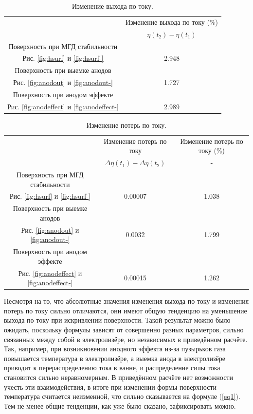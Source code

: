 \documentclass{article}
\begin{document}
\begin{table}[ht]
\centering
\begin{tabular}{|c|c|}
\hline
			& Изменение выхода по току (\%) \\
			& $\eta(t_2)-\eta(t_1)$		\\
\hline
Поверхность при МГД стабильности &	\\
Рис. \ref{fig:hsurf} и \ref{fig:hsurf-}			&2.948\\ 
\hline
Поверхность при выемке анодов &	\\
Рис. \ref{fig:anodout} и \ref{fig:anodout-}		&1.727\\ 
\hline
Поверхность при анодом эффекте &	\\
Рис. \ref{fig:anodeffect} и \ref{fig:anodeffect-}&2.989\\ 
\hline
\end{tabular}
\caption{Изменение выхода по току. \label{table:ismineniev}}
\end{table}

\begin{table}[ht]
\centering
\begin{tabular}{|c|c|c|}
\hline
			& Изменение потерь по току & Изменение потерь по току (\%)\\
			& $\Delta \eta(t_1) - \Delta \eta(t_2)$ & - \\
\hline
Поверхность при МГД стабильности & &	\\
Рис. \ref{fig:hsurf} и \ref{fig:hsurf-}			&0.00007 & 1.038\\ 
\hline
Поверхность при выемке анодов & &	\\
Рис. \ref{fig:anodout} и \ref{fig:anodout-}		&0.0032 & 1.799\\ 
\hline
Поверхность при анодом эффекте & &	\\
Рис. \ref{fig:anodeffect} и \ref{fig:anodeffect-}&0.00015 & 1.262\\ 
\hline
\end{tabular}
\caption{Изменение потерь по току. \label{table:ismineniep}}
\end{table}

Несмотря на то, что абсолютные значения изменения выхода по току и изменения потерь по току сильно отличаются, они имеют общую тенденцию на уменьшение выхода по току при искривлении поверхности. Такой результат можно было ожидать, поскольку формулы зависят от совершенно разных параметров, сильно связанных между собой в электролизёре, но независимых в приведённом расчёте. Так, например, при возникновении анодного эффекта из-за пузырьков газа повышается температура в электролизёре, а выемка анода в электролизёре приводит к перераспределению тока в ванне, и распределение силы тока становится сильно неравномерным. В приведённом расчёте нет возможности учесть эти взаимодействия, в итоге при изменении формы поверхности температура считается неизменной, что сильно сказывается на формуле (\ref{eq1}). Тем не менее общие тенденции, как уже было сказано, зафиксировать можно.
\end{document}
